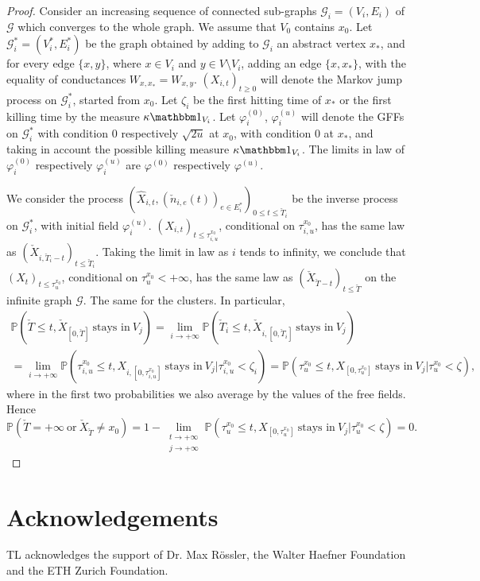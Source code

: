 \documentclass[11pt,a4paper]{amsart}
\numberwithin{equation}{section}
\def\indic{{{\mathbbm 1}}}
\begin{document}
\begin{proof}
Consider an increasing sequence of connected sub-graphs
$\mathcal{G}_{i}=(V_{i},E_{i})$ of $\mathcal{G}$ which converges to the whole graph. We assume that $V_{0}$ contains $x_{0}$.
Let $\mathcal{G}_{i}^{\ast}=(V_{i}^{\ast},E_{i}^{\ast})$ be the graph obtained by adding to $\mathcal{G}_{i}$ an abstract vertex
$x_{\ast}$, and for every edge $\lbrace x,y\rbrace$, where $x\in V_{i}$ and 
$y\in V\setminus V_{i}$, adding an edge $\lbrace x,x_{\ast}\rbrace$,
with the equality of conductances 
$W_{x,x_{\ast}}=W_{x,y}$.
$(X_{i,t})_{t\geq 0}$ will denote the Markov jump process on 
$\mathcal{G}_{i}^{\ast}$, started from $x_{0}$. 
Let $\zeta_{i}$ be the first hitting time of $x_{\ast}$ or the first
killing time by the measure $\kappa\indic_{V_{i}}$. Let
$\varphi^{(0)}_{i}$,
$\varphi^{(u)}_{i}$ will denote the GFFs on $\mathcal{G}_{i}^{\ast}$ with condition $0$ respectively $\sqrt{2u}$ at $x_{0}$, with condition $0$ at 
$x_{\ast}$, and taking in account the possible killing measure 
$\kappa\indic_{V_{i}}$. 
The limits in law of $\varphi^{(0)}_{i}$
respectively $\varphi^{(u)}_{i}$ are 
$\varphi^{(0)}$
respectively $\varphi^{(u)}$.

We consider the process 
$(\hat{X}_{i,t},(\check{n}_{i,e}(t))_{e\in E_{i}^{\ast}})
_{0\leq t\leq\check{T}_{i}}$ be the inverse process on
$\mathcal{G}_{i}^{\ast}$, with initial field $\varphi^{(u)}_{i}$.
$(X_{i,t})_{t\leq \tau_{i,u}^{x_{0}}}$, conditional on 
$\tau_{i,u}^{x_{0}}$, has the same law as
$(\check{X}_{i,\check{T}_{i}-t})_{t\leq \check{T}_{i}}$.
Taking the limit in law as $i$ tends to infinity, we conclude that
$(X_{t})_{t\leq \tau_{u}^{x_{0}}}$, conditional on 
$\tau_{u}^{x_{0}}<+\infty$, has the same law as
$(\check{X}_{\check{T}-t})_{t\leq \check{T}}$ on the infinite graph
$\mathcal{G}$. The same for the clusters.
In particular,
\begin{multline*}
\mathbb{P}(\check{T}\leq t, \check{X}_{[0,\check{T}]}~\text{stays in}~V_{j})=
\lim_{i\to +\infty}
\mathbb{P}(\check{T}_{i}\leq t, \check{X}_{i,[0,\check{T}_{i}]}~\text{stays in}~V_{j})
\\=
\lim_{i\to +\infty}
\mathbb{P}(\tau_{i,u}^{x_{0}}\leq t, X_{i,[0,\tau_{i,u}^{x_{0}}]}~\text{stays in}~V_{j}\vert \tau_{i,u}^{x_{0}}<\zeta_{i})=
\mathbb{P}(\tau_{u}^{x_{0}}\leq t, X_{[0,\tau_{u}^{x_{0}}]}
~\text{stays in}~V_{j}\vert \tau_{u}^{x_{0}} < \zeta),
\end{multline*}
where in the first two probabilities we also average by the values of the
free fields.
Hence
\begin{displaymath}
\mathbb{P}(\check{T}=+\infty~\text{or}~\check{X}_{\check{T}}\neq x_{0})=
1-\lim_{\substack{t\to +\infty\\ j\to +\infty}}
\mathbb{P}(\tau_{u}^{x_{0}}\leq t, X_{[0,\tau_{u}^{x_{0}}]}
~\text{stays in}~V_{j}\vert \tau_{u}^{x_{0}} < \zeta) = 0.
\end{displaymath}
\end{proof}

\section*{Acknowledgements}

TL acknowledges the support of Dr. Max Rössler, the Walter Haefner
Foundation and the ETH Zurich Foundation.



\end{document}
